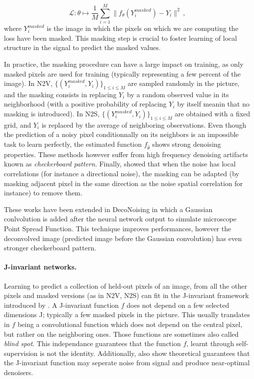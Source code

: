 \documentclass{article}
\begin{document}
$$\mathcal{L}: \theta\mapsto \frac{1}{M}\sum_{i=1}^M \|f_\theta(Y^{masked}_i) - Y_i\|^2\,, $$
where $Y^{masked}_i$ is the image in which the pixels on which we are computing the loss have been masked. This masking step is crucial to foster learning of  local structure in the signal to predict the masked values.

In practice, the masking procedure can have a large impact on training, as only masked pixels are used for training (typically representing a few percent of the image). In N2V, $\{(Y^{masked}_i,Y_i)\}_{1\leqslant i\leqslant M}$ are sampled  randomly in the picture, and the masking consists in replacing $Y_i$ by a random observed value in its neighborhood (with a positive probability of replacing $Y_i$ by itself meanin that no masking is introduced). In N2S,  $\{(Y^{masked}_i,Y_i)\}_{1\leqslant i\leqslant M}$ are obtained with  a fixed grid, and $Y_i$ is replaced by the average of neighboring observations. Even though the prediction of a noisy pixel conditionnally on its neighbors is an impossible task to learn perfectly, the estimated function $f_{\hat \theta}$ shows strong denoising properties. These methods however suffer from high frequency denoising artifacts known as \textit{checkerboard pattern}. Finally, \cite{broaddus2020removing} showed that when the noise has  local correlations (for instance a  directional noise), the masking can be adapted (by masking adjacent pixel in the same direction as the noise spatial correlation for instance) to remove them.

These works have been extended in DecoNoising \cite{goncharova2020} in which a Gaussian conlvolution is added after the neural network output to simulate microscope Point Spread Function. This technique improves performances, however the deconvolved image (predicted image before the Gaussian convolution) has even stronger checkerboard pattern.

\paragraph{J-invariant networks.}
Learning to predict a collection of held-out pixels of an image, from all the other pixels and masked versions (as in N2V, N2S) can fit in the J-invariant framework introduced by \cite{batson2019noise2self}.
A J-invariant function $f$ does not depend on a few selected dimensions J; typically a few masked pixels
in the picture.
This usually translates in $f$ being a convolutional function which does not depend on the central pixel, but rather on the neighboring ones. Those functions are sometimes also called \textit{blind spot}.
 This independance guarantees that the function $f$, learnt through self-supervision is not the identity.
 Additionally, \cite{batson2019noise2self} also show theoretical guarantees that the J-invariant function may seperate noise from signal and produce near-optimal denoisers.
\end{document}
